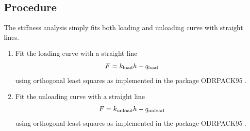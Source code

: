 \subsection{Procedure} \label{stiffness_calc}
The stiffness analysis simply fits both loading and unloading curve with straight lines. 
\begin{enumerate} 
 \item 
 Fit the loading curve with a straight line 
$$
F = k_{\mathrm{load}} h + q_{\mathrm{load}}
$$
using orthogonal least squares as implemented in the package ODRPACK95 \cite{odrpack95}.
\item
Fit the unloading curve with a straight line 
$$
F = k_{\mathrm{unload}} h + q_{\mathrm{unload}}
$$
using orthogonal least squares as implemented in the package ODRPACK95 \cite{odrpack95}. 

\end{enumerate}


